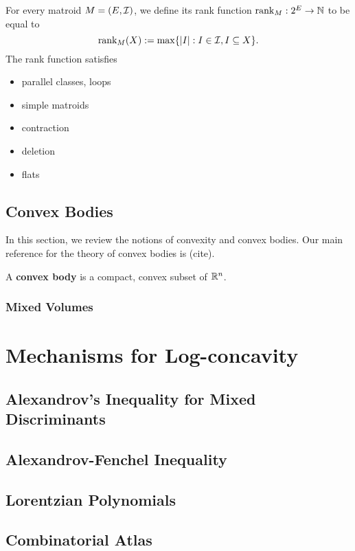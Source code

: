 \documentclass{puthesis-UG}
\begin{document}
\begin{defn}
	For every matroid $M = (E, \mathcal{I})$, we define its rank function $\operatorname{rank}_M : 2^E \to \mathbb{N}$ to be equal to
	\[
		\operatorname{rank}_M(X) := \max \{|I| : I \in \mathcal{I}, I \subseteq X\}.
	\]
	The rank function satisfies 
\end{defn}

\begin{itemize}
	\item parallel classes, loops
	\item simple matroids
	\item contraction
	\item deletion
	\item flats
\end{itemize}

\section{Convex Bodies}

In this section, we review the notions of convexity and convex bodies. Our main reference for the theory of convex bodies is (cite).

\begin{defn}
	A \textbf{convex body} is a compact, convex subset of $\mathbb{R}^n$.
\end{defn}
\subsection{Mixed Volumes}

\chapter{Mechanisms for Log-concavity}

\section{Alexandrov's Inequality for Mixed Discriminants}

\section{Alexandrov-Fenchel Inequality}

\section{Lorentzian Polynomials}

\section{Combinatorial Atlas}
\end{document}
